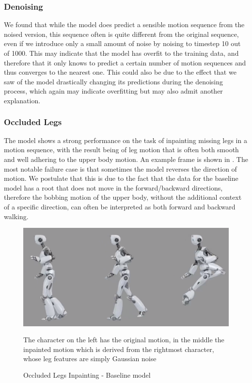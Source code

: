 \subsubsection{Denoising}
We found that while the model does predict a sensible motion sequence from the noised version, this sequence often is quite different from the original sequence, even if we introduce only a small amount of noise by noising to timestep 10 out of 1000. This may indicate that the model has overfit to the training data, and therefore that it only knows to predict a certain number of motion sequences and thus converges to the nearest one. This could also be due to the effect that we saw of the model drastically changing its predictions during the denoising process, which again may indicate overfitting but may also admit another explanation.

\subsubsection{Occluded Legs}
The model shows a strong performance on the task of inpainting missing legs in a motion sequence, with the result being of leg motion that is often both smooth and well adhering to the upper body motion. An example frame is shown in . 
The most notable failure case is that sometimes the model reverses the direction of motion. We postulate that this is due to the fact that the data for the baseline model has a root that does not move in the forward/backward directions, therefore the bobbing motion of the upper body, without the additional context of a specific direction, can often be interpreted as both forward and backward walking.

\begin{figure}[!ht]
    \centering
    \includegraphics[width=1\textwidth]{Figures/diffusion/results/basline_inpainting_legs.png}
    \caption{Occluded Legs Inpainting - Baseline model}
    \label{fig:baseline_occluded_legs}
    \medskip
    \small
    \raggedright
    The character on the left has the original motion, in the middle the inpainted motion which is derived from the rightmost character, whose leg features are simply Gaussian noise
\end{figure}


